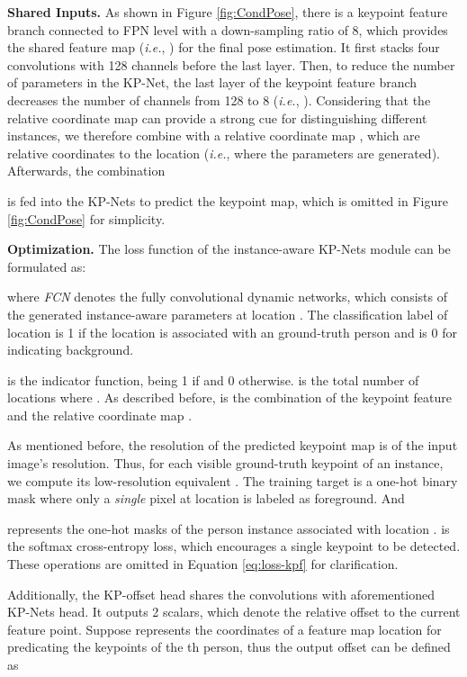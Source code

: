 \documentclass[sigconf]{acmart}
\begin{document}
\textbf{Shared Inputs.}\quad
As shown in Figure \ref{fig:CondPose}, there is a keypoint feature branch connected to FPN level  with a down-sampling ratio of 8, which provides the shared feature map  (\emph{i.e.}, ) for the final pose estimation.
It first stacks four  convolutions with 128 channels before the last layer.
Then, to reduce the number of parameters in the KP-Net, the last layer of the keypoint feature branch decreases the number of channels from 128 to 8 (\textit{i.e.}, ).
Considering that the relative coordinate map can provide a strong cue for distinguishing different instances, we therefore combine  with a relative coordinate map
,
which are relative coordinates to the location  (\textit{i.e.}, where the parameters  are generated).
Afterwards, the combination

is fed into the KP-Nets to predict the keypoint map, which is omitted in Figure \ref{fig:CondPose} for simplicity.

\textbf{Optimization.}\quad
The loss function of the instance-aware KP-Nets module can be formulated as:

where \textit{FCN} denotes the fully convolutional dynamic networks, which consists of the generated instance-aware parameters  at location .
The classification label  of location  is 1 if the location is associated with an ground-truth person and is 0 for indicating background.

is the indicator function, being 1 if  and 0 otherwise.
 is the total number of locations where .
As described before,  is the combination of the keypoint feature  and the relative coordinate map .

As mentioned before, the resolution of the predicted keypoint map is  of the input image’s resolution. Thus, for each visible ground-truth keypoint of an instance, we compute its low-resolution equivalent . The training target is a one-hot  binary mask where only a \textit{single} pixel at location  is labeled as foreground.
And

represents the  one-hot masks of the person instance associated with location .  is the softmax cross-entropy loss, which encourages a single keypoint to be detected. These operations are omitted in Equation \eqref{eq:loss-kpf} for clarification.


\iffalse
Additionally, the KP-offset head shares the convolutions with aforementioned KP-Nets head. It outputs 2 scalars, which denote the relative offset to the current feature point. Suppose  represents the coordinates of a feature map location for predicating the keypoints of the th person, thus the output  offset can be defined as
\end{document}
